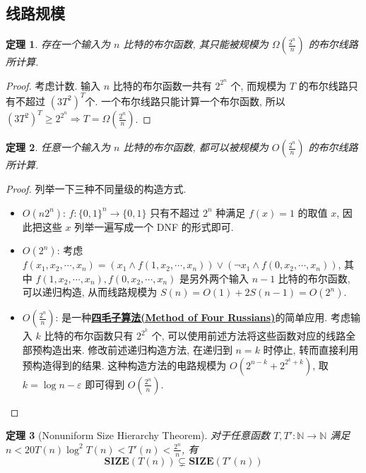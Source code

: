 \documentclass[8pt]{article}
\theoremstyle{compact}
\newtheorem{theorem}{定理}[section]
\def\obj#1{\textbf{\uline{#1}}}
\def\ge{\geqslant}
\def\SIZE{\textbf{SIZE}}
\begin{document}
\subsection{线路规模}
\begin{theorem}
	存在一个输入为 $n$ 比特的布尔函数, 其只能被规模为 $\Omega\left(\frac{2^n}{n}\right)$ 的布尔线路所计算.
\end{theorem}
\begin{proof}
	考虑计数. 输入 $n$ 比特的布尔函数一共有 $2^{2^n}$ 个, 而规模为 $T$ 的布尔线路只有不超过 $\left(3T^2\right)^T$个. 一个布尔线路只能计算一个布尔函数, 所以 $(3T^2)^T \ge 2^{2^n} \Rightarrow T = \Omega(\frac{2^n}{n})$.
\end{proof}
\begin{theorem}
	任意一个输入为 $n$ 比特的布尔函数, 都可以被规模为 $O\left(\frac{2^n}{n}\right)$ 的布尔线路所计算.
\end{theorem}
\begin{proof}
	列举一下三种不同量级的构造方式.
	\begin{itemize}
		\item $O(n2^n)$: $f: \{0, 1\}^n \to \{0, 1\}$ 只有不超过 $2^n$ 种满足 $f(x) = 1$ 的取值 $x$, 因此把这些 $x$ 列举一遍写成一个 DNF 的形式即可.
		\item $O(2^n)$: 考虑 $f(x_1, x_2, \cdots, x_n) = (x_1 \wedge f(1, x_2, \cdots, x_n)) \vee (\lnot x_1 \wedge f(0, x_2, \cdots, x_n))$, 其中 $f(1, x_2, \cdots, x_n), f(0, x_2, \cdots, x_n)$ 是另外两个输入 $n - 1$ 比特的布尔函数, 可以递归构造, 从而线路规模为 $S(n) = O(1) + 2S(n - 1) = O(2^n)$.
		\item $O\left(\frac{2^n}{n}\right)$: 是一种\obj{四毛子算法(Method of Four Russians)}的简单应用. 考虑输入 $k$ 比特的布尔函数只有 $2^{2^k}$ 个, 可以使用前述方法将这些函数对应的线路全部预构造出来. 修改前述递归构造方法, 在递归到 $n = k$ 时停止, 转而直接利用预构造得到的结果. 这种构造方法的电路规模为 $O(2^{n - k} + 2^{2^k + k})$, 取 $k = \log n - \varepsilon$ 即可得到 $O\left(\frac{2^n}{n}\right)$.
	\end{itemize}
\end{proof}
\begin{theorem}[Nonuniform Size Hierarchy Theorem]
	对于任意函数 $T, T': \mathbb N \to \mathbb N$ 满足 $n < 20T(n)\log^2 T(n) < T'(n) < \frac{2^n}{n}$, 有 $$\SIZE(T(n)) \subsetneq \SIZE(T'(n))$$
\end{theorem}
\end{document}
